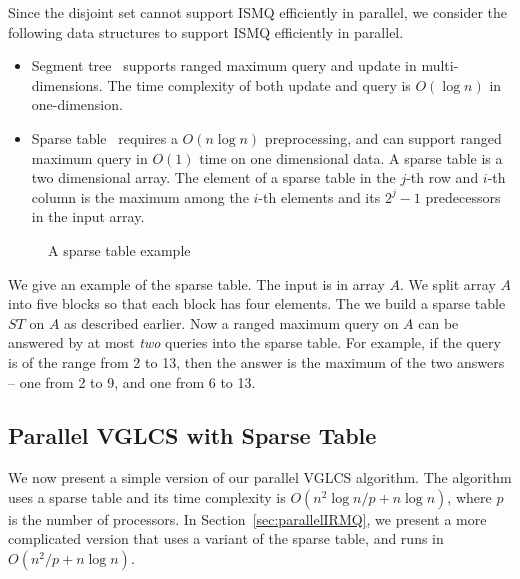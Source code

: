 Since the disjoint set cannot support ISMQ efficiently in parallel, we
consider the following data structures to support ISMQ efficiently in
parallel.

\begin{itemize}
  \item Segment tree~\cite{berg2000computational} supports ranged
    maximum query and update in multi-dimensions.  The time complexity
    of both update and query is $O(\log n)$ in one-dimension.
  \item Sparse table~\cite{Berkman1993RecursiveSP} requires a $O(n
    \log n)$ preprocessing, and can support ranged maximum query in
    $O(1)$ time on one dimensional data.  A sparse table is a two
    dimensional array.  The element of a sparse table in the $j$-th
    row and $i$-th column is the maximum among the $i$-th elements
    and its $2^j - 1$ predecessors in the input array.
\end{itemize}

\begin{figure}[!thb]
  \centering {} 
  \caption{A sparse table example}
  \label{fig:interval-decomposition}
\end{figure}

We give an example of the sparse table.  The input is in array $A$. We
split array $A$ into five blocks so that each block has four elements.
The we build a sparse table $ST$ on $A$ as described earlier.  Now a
ranged maximum query on $A$ can be answered by at most {\em two}
queries into the sparse table.  For example, if the query is of the
range from 2 to 13, then the answer is the maximum of the two answers
-- one from 2 to 9, and one from 6 to 13.

\subsection{Parallel VGLCS with Sparse Table}

We now present a simple version of our parallel VGLCS algorithm.  The
algorithm uses a sparse table and its time complexity is $O(n^2 \log n
/ p + n \log n)$, where $p$ is the number of processors.  In
Section~\ref{sec:parallelIRMQ}, we present a more complicated version
that uses a variant of the sparse table, and runs in $O(n^2 / p + n
\log n)$.

